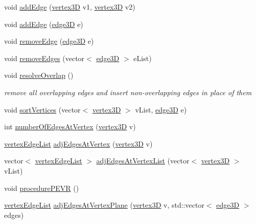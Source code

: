 \begin{DoxyCompactItemize}
\item 
void \mbox{\hyperlink{classwire_frame_ac743b6520445f5e1e90a760847d47666}{add\+Edge}} (\mbox{\hyperlink{structvertex3_d}{vertex3D}} v1, \mbox{\hyperlink{structvertex3_d}{vertex3D}} v2)
\item 
void \mbox{\hyperlink{classwire_frame_a63d72eec6ac26bb6d07d0662a936070a}{add\+Edge}} (\mbox{\hyperlink{structedge3_d}{edge3D}} e)
\item 
void \mbox{\hyperlink{classwire_frame_ada138a38cdece351080b0967605bd0ca}{remove\+Edge}} (\mbox{\hyperlink{structedge3_d}{edge3D}} e)
\item 
void \mbox{\hyperlink{classwire_frame_ad1410339bc0716c4d2ca39f331923b42}{remove\+Edges}} (vector$<$ \mbox{\hyperlink{structedge3_d}{edge3D}} $>$ e\+List)
\item 
void \mbox{\hyperlink{classwire_frame_adaca5f3e21a232ad7eef8135b2e470dd}{resolve\+Overlap}} ()
\begin{DoxyCompactList}\small\item\em remove all overlapping edges and insert non-\/overlapping edges in place of them \end{DoxyCompactList}\item 
void \mbox{\hyperlink{classwire_frame_a14535da73afb6388a89fb3c645ba5d18}{sort\+Vertices}} (vector$<$ \mbox{\hyperlink{structvertex3_d}{vertex3D}} $>$ v\+List, \mbox{\hyperlink{structedge3_d}{edge3D}} e)
\item 
int \mbox{\hyperlink{classwire_frame_a0843bbf4ca224f42f9191ef5b1263c36}{number\+Of\+Edges\+At\+Vertex}} (\mbox{\hyperlink{structvertex3_d}{vertex3D}} v)
\item 
\mbox{\hyperlink{structvertex_edge_list}{vertex\+Edge\+List}} \mbox{\hyperlink{classwire_frame_ae67d78b40bd171b508f9d5575121aab6}{adj\+Edges\+At\+Vertex}} (\mbox{\hyperlink{structvertex3_d}{vertex3D}} v)
\item 
vector$<$ \mbox{\hyperlink{structvertex_edge_list}{vertex\+Edge\+List}} $>$ \mbox{\hyperlink{classwire_frame_a06a9b12235430a64bfb612ea2697bf4c}{adj\+Edges\+At\+Vertex\+List}} (vector$<$ \mbox{\hyperlink{structvertex3_d}{vertex3D}} $>$ v\+List)
\item 
void \mbox{\hyperlink{classwire_frame_a3799d04d265a08d30e06d5d18facd04d}{procedure\+P\+E\+VR}} ()
\item 
\mbox{\hyperlink{structvertex_edge_list}{vertex\+Edge\+List}} \mbox{\hyperlink{classwire_frame_a717d472ad2f30ef43e26258794a944e7}{adj\+Edges\+At\+Vertex\+Plane}} (\mbox{\hyperlink{structvertex3_d}{vertex3D}} v, std\+::vector$<$ \mbox{\hyperlink{structedge3_d}{edge3D}} $>$ edges)

\end{DoxyCompactItemize}
